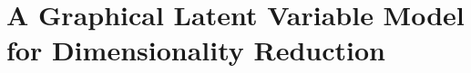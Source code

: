 
\chapter{A Graphical Latent Variable Model for Dimensionality Reduction}\label{chapter:GraphCoupling}


\minitoc






